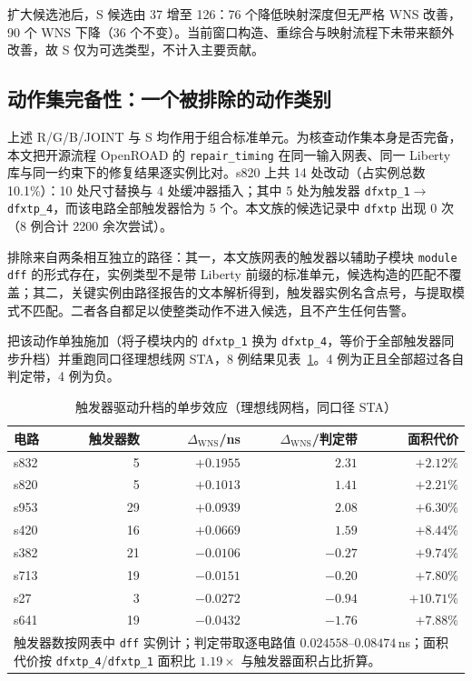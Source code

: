\documentclass[twocolumn,10pt,fontset=windows]{ctexart}
\begin{document}
扩大候选池后，S 候选由 37 增至 126：76 个降低映射深度但无严格 WNS 改善，90 个 WNS 下降（36 个不变）。当前窗口构造、重综合与映射流程下未带来额外改善，故 S 仅为可选类型，不计入主要贡献。

\subsection{动作集完备性：一个被排除的动作类别}\label{sec:ff_gap}

上述 R/G/B/JOINT 与 S 均作用于组合标准单元。为核查动作集本身是否完备，本文把开源流程 OpenROAD 的 \texttt{repair\_timing} 在同一输入网表、同一 Liberty 库与同一约束下的修复结果逐实例比对。s820 上共 14 处改动（占实例总数 10.1\%）：10 处尺寸替换与 4 处缓冲器插入；其中 5 处为触发器 \texttt{dfxtp\_1}$\to$\texttt{dfxtp\_4}，而该电路全部触发器恰为 5 个。本文族的候选记录中 \texttt{dfxtp} 出现 0 次（8 例合计 2200 余次尝试）。

排除来自两条相互独立的路径：其一，本文族网表的触发器以辅助子模块 \texttt{module dff} 的形式存在，实例类型不是带 Liberty 前缀的标准单元，候选构造的匹配不覆盖；其二，关键实例由路径报告的文本解析得到，触发器实例名含点号，与提取模式不匹配。二者各自都足以使整类动作不进入候选，且不产生任何告警。

把该动作单独施加（将子模块内的 \texttt{dfxtp\_1} 换为 \texttt{dfxtp\_4}，等价于全部触发器同步升档）并重跑同口径理想线网 STA，8 例结果见表~\ref{tab:ff_gap}。4 例为正且全部超过各自判定带，4 例为负。

\begin{table}[H]
\centering
\caption{触发器驱动升档的单步效应（理想线网档，同口径 STA）}
\label{tab:ff_gap}
\footnotesize
\setlength{\tabcolsep}{6pt}
\begin{tabular}{lrrrr}
\toprule
\textbf{电路} & \textbf{触发器数} & \textbf{$\Delta_{\mathrm{WNS}}$/ns} & \textbf{$\Delta_{\mathrm{WNS}}$/判定带} & \textbf{面积代价} \\
\midrule
s832 & 5  & $+0.1955$ & $2.31$ & $+2.12\%$ \\
s820 & 5  & $+0.1013$ & $1.41$ & $+2.21\%$ \\
s953 & 29 & $+0.0939$ & $2.08$ & $+6.30\%$ \\
s420 & 16 & $+0.0669$ & $1.59$ & $+8.44\%$ \\
s382 & 21 & $-0.0106$ & $-0.27$ & $+9.74\%$ \\
s713 & 19 & $-0.0151$ & $-0.20$ & $+7.80\%$ \\
s27  & 3  & $-0.0272$ & $-0.94$ & $+10.71\%$ \\
s641 & 19 & $-0.0432$ & $-1.76$ & $+7.88\%$ \\
\bottomrule
\multicolumn{5}{p{0.94\columnwidth}}{\footnotesize 触发器数按网表中 \texttt{dff} 实例计；判定带取逐电路值 $0.024558$--$0.08474$\,ns；面积代价按 \texttt{dfxtp\_4}/\texttt{dfxtp\_1} 面积比 $1.19\times$ 与触发器面积占比折算。}\\
\end{tabular}
\end{table}
\end{document}

